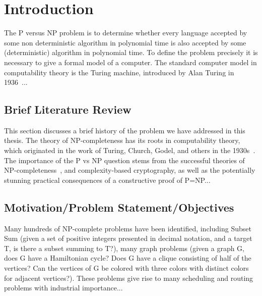 \documentclass[12pt,A4paper]{article}
\begin{document}
\setcounter{page}{-1}



\doublespacing
\tableofcontents
\onehalfspacing
\newpage

\setcounter{page}{0}





\section{Introduction}

The P versus NP problem is to determine whether every language accepted by some non deterministic algorithm in polynomial time is also accepted by some (deterministic) algorithm in polynomial time. To define the problem precisely it is necessary to give a formal model of a computer. The standard computer model in computability theory is the Turing machine, introduced by Alan Turing in 1936~\cite{turing1936computable}...


\subsection{Brief Literature Review}
This section discusses a brief history of the problem we have addressed in this thesis. The theory of NP-completeness has its roots in computability theory, which
originated in the work of Turing, Church, Godel, and others in the 1930s~\cite{church1936note}. The importance of the P vs NP question stems from the successful theories of NP-completeness~\cite{cook1971complexity}, and complexity-based cryptography, as well as the potentially stunning practical consequences of a constructive proof of P=NP...

\subsection{Motivation/Problem Statement/Objectives}
Many hundreds of NP-complete problems have been identified, including Subset Sum (given a set of positive integers presented in decimal notation, and a target T, is there a subset summing to T?), many graph problems (given a graph G, does G have a Hamiltonian cycle? Does G have a clique consisting of half of the vertices? Can the vertices of G be colored with three colors with distinct colors for adjacent vertices?). These problems give rise to many scheduling and routing problems with industrial importance...
\end{document}
